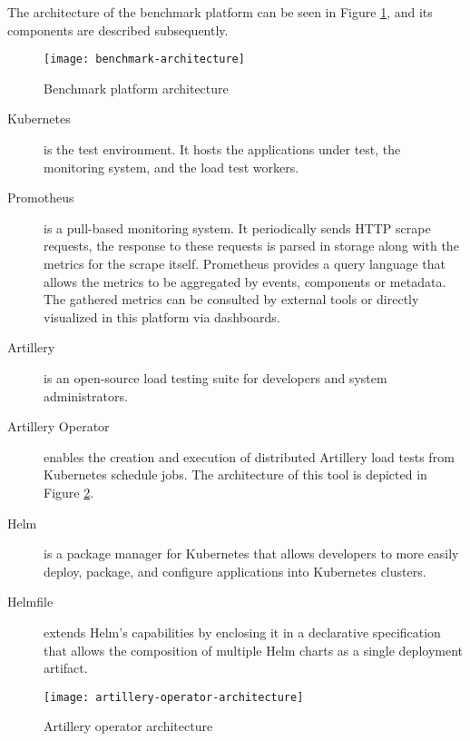 The architecture of the benchmark platform can be seen in Figure \ref{fig:benchmarkarchitecture}, and its components are described subsequently.

\begin{figure}[htbp]
    \centering
    \centerline{\texttt{[image: benchmark-architecture]}}
    \caption{Benchmark platform architecture}
    \label{fig:benchmarkarchitecture}
\end{figure}

\begin{description}
    \item[Kubernetes \cite{kubernetes}] is the test environment. It hosts the applications under test, the monitoring system, and the load test workers.
    \item[Promotheus \cite{turnbull2018monitoring}] is a pull-based monitoring system.
    It periodically sends HTTP scrape requests, the response to these requests is parsed in storage along with the metrics for the scrape itself.
    Prometheus provides a query language that allows the metrics to be aggregated by events, components or metadata.
    The gathered metrics can be consulted by external tools or directly visualized in this platform via dashboards.
    \item[Artillery \cite{artillery}] is an open-source load testing suite for developers and system administrators.
    \item[Artillery Operator \cite{artilleryop}] enables the creation and execution of distributed Artillery load tests from Kubernetes schedule jobs.
    The architecture of this tool is depicted in Figure \ref{fig:artilleryoperator}.
    \item[Helm \cite{helm}] is a package manager for Kubernetes that allows developers to more easily deploy, package, and configure applications into Kubernetes clusters.
    \item[Helmfile \cite{helmfile}] extends Helm's capabilities by enclosing it in a declarative specification that allows the composition of multiple Helm charts as a single deployment artifact.
\end{description}

\begin{figure}[htbp]
    \centering
    \centerline{\texttt{[image: artillery-operator-architecture]}}
    \caption{Artillery operator architecture}
    \label{fig:artilleryoperator}
\end{figure}

